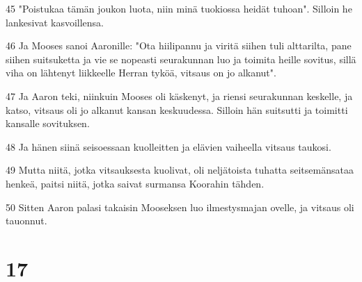 \par 45 "Poistukaa tämän joukon luota, niin minä tuokiossa heidät tuhoan". Silloin he lankesivat kasvoillensa.
\par 46 Ja Mooses sanoi Aaronille: "Ota hiilipannu ja viritä siihen tuli alttarilta, pane siihen suitsuketta ja vie se nopeasti seurakunnan luo ja toimita heille sovitus, sillä viha on lähtenyt liikkeelle Herran tyköä, vitsaus on jo alkanut".
\par 47 Ja Aaron teki, niinkuin Mooses oli käskenyt, ja riensi seurakunnan keskelle, ja katso, vitsaus oli jo alkanut kansan keskuudessa. Silloin hän suitsutti ja toimitti kansalle sovituksen.
\par 48 Ja hänen siinä seisoessaan kuolleitten ja elävien vaiheella vitsaus taukosi.
\par 49 Mutta niitä, jotka vitsauksesta kuolivat, oli neljätoista tuhatta seitsemänsataa henkeä, paitsi niitä, jotka saivat surmansa Koorahin tähden.
\par 50 Sitten Aaron palasi takaisin Mooseksen luo ilmestysmajan ovelle, ja vitsaus oli tauonnut.

\chapter{17}

